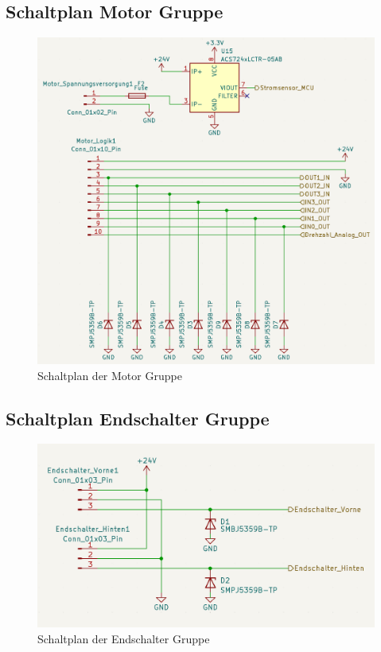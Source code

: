\subsection{Schaltplan Motor Gruppe}
\begin{figure}[H]
	\centering
	\includegraphics[width=1.0\textwidth]{images/Hardware/Motor_Schaltplan.PNG}
	\caption{Schaltplan der Motor Gruppe}
	\label{fig:MotorGruppe}
\end{figure}
\subsection{Schaltplan Endschalter Gruppe}
\begin{figure}[H]
	\centering
	\includegraphics[width=1.0\textwidth]{images/Hardware/Endschalter_Schaltplan.PNG}
	\caption{Schaltplan der Endschalter Gruppe}
	\label{fig:EndschalterGruppe}
\end{figure}

